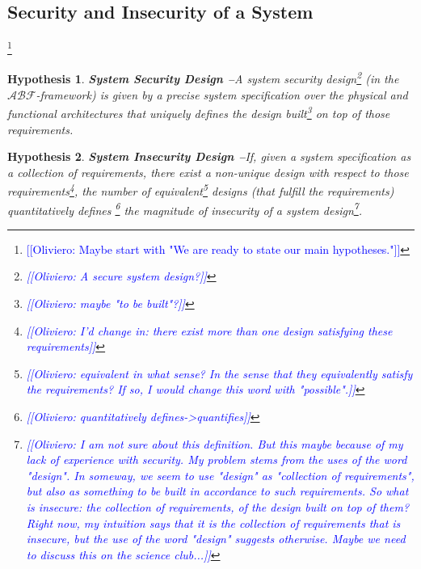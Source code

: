 \documentclass[runningheads]{llncs}
\newcommand{\assertionRegion}{\mathcal{A}}
\newcommand{\beliefRegion}{\mathcal{B}}
\newcommand{\factRegion}{\mathcal{F}}
\newcommand{\abftheory}{\assertionRegion\beliefRegion\factRegion}
\newtheorem{hypothesis}{Hypothesis}%
\newcommand{\ON}[1]{\footnote{\textcolor{blue}{[[Oliviero: #1]]}}}
\begin{document}
\subsection{Security and Insecurity of a System}\label{sec:formula}

\ON{Maybe start with "We are ready to state our main hypotheses."}

\begin{hypothesis}{\bf System Security Design --}\label{hyp:security}
	A system security design\ON{A secure system design?} (in the $\abftheory$-framework) is given by a
	precise system specification over the physical and functional
	architectures that uniquely defines the design built\ON{maybe "to be built"?} on top of those
	requirements.
\end{hypothesis}

\begin{hypothesis}{\bf System Insecurity Design --}\label{hyp:insecurity}
	If, given a system specification as a collection of requirements, there
	exist a non-unique design with respect to those requirements\ON{I'd change in: there exist more than one design satisfying these requirements}, the
	number of equivalent\ON{equivalent in what sense? In the sense that they equivalently satisfy the requirements? If so, I would change this word with "possible".} designs (that fulfill the requirements)
	quantitatively defines \ON{quantitatively defines->quantifies} the magnitude of insecurity of a system design\ON{I am not sure about this definition. But this maybe because of my lack of experience with security. My problem stems from the uses of the word "design". In someway, we seem to use "design" as "collection of requirements", but also as something to be built in accordance to such requirements. So what is insecure: the collection of requirements, of the design built on top of them? Right now, my intuition says that it is the collection of requirements that is insecure, but the use of the word "design" suggests otherwise. Maybe we need to discuss this on the science club...}.
\end{hypothesis}
\end{document}
